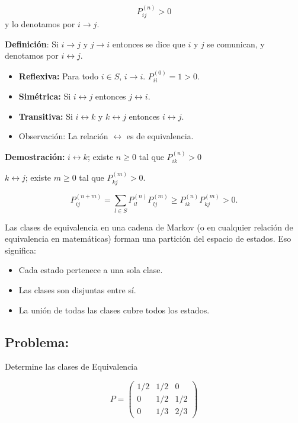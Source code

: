 \documentclass[12pt,a4paper]{article}
\begin{document}
\begin{equation*}
P_{ij}^{(n)} > 0
\end{equation*}
y lo denotamos por $i \to j$.

\textbf{Definición}: Si $i \to j$ y $j \to i$ entonces se dice que $i$ y $j$ se comunican, y denotamos por $i \leftrightarrow j$.

\begin{itemize}
    \item \textbf{Reflexiva:} Para todo $i \in S$, $i \to i$. $P_{ii}^{(0)} = 1 > 0$.
    \item \textbf{Simétrica:} Si $i \leftrightarrow j$ entonces $j \leftrightarrow i$.
    \item \textbf{Transitiva:} Si $i \leftrightarrow k$ y $k \leftrightarrow j$ entonces $i \leftrightarrow j$.
    \item Observación: La relación $\leftrightarrow$ es de equivalencia.
\end{itemize}

\textbf{Demostración:} $i \leftrightarrow k$; existe $n \geq 0$ tal que $P_{ik}^{(n)} > 0$

$k \leftrightarrow j$; existe $m \geq 0$ tal que $P_{kj}^{(m)} > 0$.

\begin{equation*}
P_{ij}^{(n+m)} = \sum_{l \in S} P_{il}^{(n)} P_{lj}^{(m)} \geq P_{ik}^{(n)} P_{kj}^{(m)} > 0.
\end{equation*}


Las clases de equivalencia en una cadena de Markov (o en cualquier relación de equivalencia en matemáticas) forman una partición del espacio de estados. Eso significa:

\begin{itemize}
    \item Cada estado pertenece a una sola clase.
    \item Las clases son disjuntas entre sí.
    \item La unión de todas las clases cubre todos los estados.
\end{itemize}


\subsection*{Problema:}
Determine las clases de Equivalencia

\begin{equation*}
P = \begin{pmatrix}
1/2 & 1/2 & 0 \\
0 & 1/2 & 1/2 \\
0 & 1/3 & 2/3
\end{pmatrix}
\end{equation*}
\end{document}
